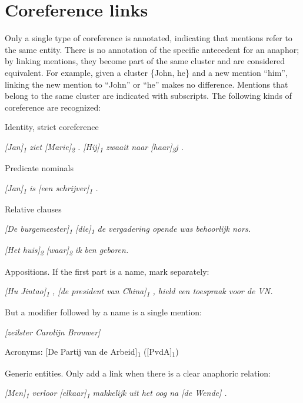 \section{Coreference links}

Only a single type of coreference is annotated, indicating that
mentions refer to the same entity. There is no annotation of the
specific antecedent for an anaphor; by linking mentions, they become
part of the same cluster and are considered equivalent. For example,
given a cluster \{John, he\} and a new mention ``him'', linking the new
mention to ``John'' or ``he'' makes no difference. Mentions that belong to the
same cluster are indicated with subscripts. The following kinds of
coreference are recognized:

\begin{itemize*}
\item Identity, strict coreference

    \emph{[Jan]\textsubscript{1} ziet [Marie]\textsubscript{2} .
    [Hij]\textsubscript{1} zwaait naar [haar]\textsubscript{2}j .}


\item Predicate nominals

  \emph{{[}Jan{]}\textsubscript{1} is {[}een schrijver{]}\textsubscript{1} .}

\item Relative clauses

    \emph{[De burgemeester]\textsubscript{1} {[}die{]}\textsubscript{1} de vergadering opende was behoorlijk nors.}

    \emph{[Het huis]\textsubscript{2} [waar]\textsubscript{2} ik ben geboren.}

\item Appositions. If the first part is a name, mark separately:

  \emph{{[}Hu Jintao{]}\textsubscript{1} , {[}de president van China{]}\textsubscript{1} , hield een
  toespraak voor de VN.}

  But a modifier followed by a name is a single mention:

  \emph{{[}zeilster Carolijn Brouwer{]}}

\item Acronyms: [De Partij van de Arbeid]\textsubscript{1} ([PvdA]\textsubscript{1})

\item Generic entities. Only add a link when there is a clear anaphoric relation:

    \emph{[Men]\textsubscript{1} verloor [elkaar]\textsubscript{1} makkelijk uit het oog na [de Wende] .}


\end{itemize*}
